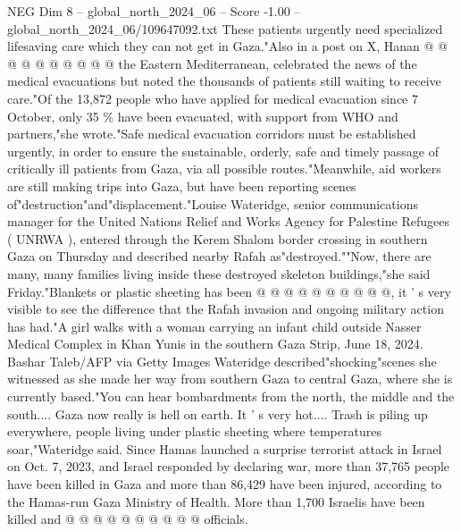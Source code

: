 \begin{textsample}{NEG Dim 8 – global\_north\_2024\_06 – Score -1.00 – global\_north\_2024\_06/109647092.txt}
These patients urgently need specialized lifesaving care which they can not get in Gaza."Also in a post on X, Hanan @ @ @ @ @ @ @ @ @ @ the Eastern Mediterranean, celebrated the news of the medical evacuations but noted the thousands of patients still waiting to receive care."Of the 13,872 people who have applied for medical evacuation since 7 October, only 35 \% have been evacuated, with support from WHO and partners,"she wrote."Safe medical evacuation corridors must be established urgently, in order to ensure the sustainable, orderly, safe and timely passage of critically ill patients from Gaza, via all possible routes."Meanwhile, aid workers are still making trips into Gaza, but have been reporting scenes of"destruction"and"displacement."Louise Wateridge, senior communications manager for the United Nations Relief and Works Agency for Palestine Refugees ( UNRWA ), entered through the Kerem Shalom border crossing in southern Gaza on Thursday and described nearby Rafah as"destroyed.""Now, there are many, many families living inside these destroyed skeleton buildings,"she said Friday."Blankets or plastic sheeting has been @ @ @ @ @ @ @ @ @ @, it ' s very visible to see the difference that the Rafah invasion and ongoing military action has had."A girl walks with a woman carrying an infant child outside Nasser Medical Complex in Khan Yunis in the southern Gaza Strip, June 18, 2024.
Bashar Taleb/AFP via Getty Images Wateridge described"shocking"scenes she witnessed as she made her way from southern Gaza to central Gaza, where she is currently based."You can hear bombardments from the north, the middle and the south....
Gaza now really is hell on earth.
It ' s very hot....
Trash is piling up everywhere, people living under plastic sheeting where temperatures soar,"Wateridge said.
Since Hamas launched a surprise terrorist attack in Israel on Oct. 7, 2023, and Israel responded by declaring war, more than 37,765 people have been killed in Gaza and more than 86,429 have been injured, according to the Hamas-run Gaza Ministry of Health.
More than 1,700 Israelis have been killed and @ @ @ @ @ @ @ @ @ @ officials.

\end{textsample}
